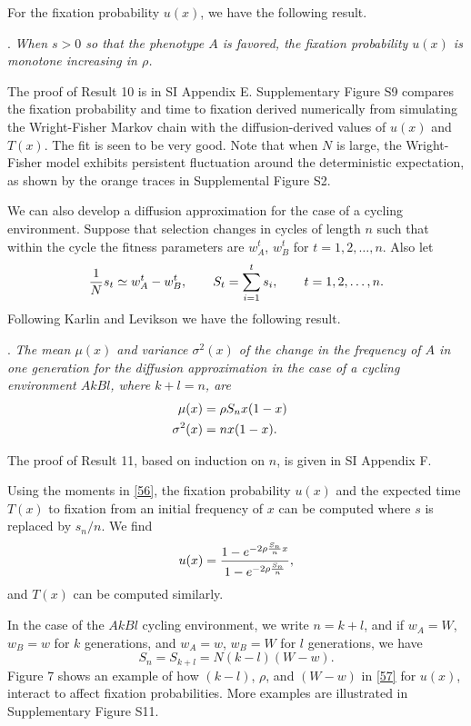 \documentclass[9pt,twocolumn,twoside,lineno]{pnas-new}
\newcommand{\an}[1]{\begin{align}#1\end{align}}
\begin{document}
  For the fixation probability $u(x)$,  we have the following result.
 \medskip
  
. {\sl When $s>0$ so that the phenotype $A$ is favored, the fixation probability $u(x)$ is monotone increasing in $\rho$.}\par
 \medskip
 
 The proof of Result 10 is in SI Appendix E.  
  Supplementary Figure S9 compares the fixation probability and time to fixation derived numerically from  simulating the Wright-Fisher Markov chain with the diffusion-derived values of $u(x)$ and $T(x)$. The fit is seen to be very good. Note that when $N$ is large, the Wright-Fisher model exhibits persistent fluctuation around the deterministic expectation, as shown by the orange traces in Supplemental Figure S2.
 
 We can also develop a diffusion approximation for the case of a cycling environment. Suppose that selection changes in cycles of length $n$ such that within the cycle the fitness parameters are $w_A^t$, $w_B^t$ for $t=1,2,\dots,n$. Also let
 \begin{equation}
 {1\over N}s_t \simeq w_A^t -w_B^t,\qquad S_t =\sum_{i=1}^t s_i,\qquad t=1,2,\dots,n.
 \label{55}\end{equation}
 Following Karlin and Levikson \cite{karlin1974temporal} we have the following result.
 \medskip
 
 . {\sl The mean $\mu(x)$ and variance $\sigma^2(x)$ of the change in the frequency of $A$ in one generation for the diffusion approximation in the case of a cycling environment $AkBl$, where $k+l=n$, are
 \begin{equation}
 \an{
 \mu(x) &= \rho S_n x(1-x)\cr \sigma^2(x) &= nx(1-x).}
 \label{56}\end{equation}}
 
\noindent The proof of Result 11, based on induction on $n$, is given in SI Appendix F.
 
  
 Using the moments in \eqref{56}, the fixation probability $u(x)$ and the expected time $T(x)$ to fixation from an initial frequency of $x$ can be computed where $s$ is replaced by $s_n/n$. We find
 \begin{equation}
 u(x) ={1-e^{-2\rho{S_n\over n}x}\over 1-e^{-2\rho{S_n\over n}}},
\label{57} \end{equation}
 and $T(x)$ can be computed similarly.
 
 In the  case of the $AkBl$ cycling environment, we write $n=k+l$, and if $w_A=W$, $w_B=w$ for $k$ generations, and $w_A=w$, $w_B=W$ for $l$ generations, we have
 \begin{equation}
 S_n=S_{k+l} =N(k-l)(W-w).
 \label{58}\end{equation}
 Figure 7 shows an example of how $(k-l)$, $\rho$, and $(W-w)$  in \eqref{57} for $u(x)$, interact to affect fixation probabilities. More examples are illustrated in Supplementary Figure S11.
\end{document}
